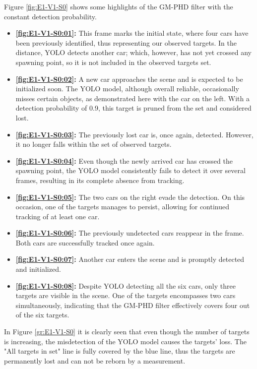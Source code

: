 Figure \ref{fig:E1-V1-S0} shows some highlights of the GM-PHD filter with the constant detection probability.
\begin{itemize}
    \item \textbf{\ref{fig:E1-V1-S0:01}:} This frame marks the initial state, where four cars have been previously
    identified, thus representing our observed targets. In the distance, YOLO detects another car; which, however,
    has not yet crossed any spawning point, so it is not included in the observed targets set.
    \item \textbf{\ref{fig:E1-V1-S0:02}:} A new car approaches the scene and is expected to be initialized soon. The
    YOLO model, although overall reliable, occasionally misses certain objects, as demonstrated here with the
    car on the left. With a detection probability of 0.9, this target is pruned from the set and considered lost.
    \item \textbf{\ref{fig:E1-V1-S0:03}:} The previously lost car is, once again, detected. However, it no longer
    falls within the set of observed targets.
    \item \textbf{\ref{fig:E1-V1-S0:04}:} Even though the newly arrived car has crossed the spawning point, the YOLO model
    consistently
    fails to detect it over several frames, resulting in its complete absence from tracking.
    \item \textbf{\ref{fig:E1-V1-S0:05}:} The two cars on the right evade the detection. On this occasion, one
    of the targets manages to persist, allowing for continued tracking of at least one car.
    \item \textbf{\ref{fig:E1-V1-S0:06}:} The previously undetected cars reappear in the frame. Both cars are
    successfully tracked once again.
    \item \textbf{\ref{fig:E1-V1-S0:07}:} Another car enters the scene and is promptly detected and initialized.
    \item \textbf{\ref{fig:E1-V1-S0:08}:} Despite YOLO detecting all the six cars, only three targets are visible in the
    scene. One of the targets encompasses two cars simultaneously, indicating that the GM-PHD filter effectively covers four out of the six targets.
\end{itemize}

In Figure \ref{gr:E1-V1-S0} it is clearly seen that even though the number of targets is increasing, the misdetection
of the YOLO model causes the targets' loss. The "All targets in set" line is fully covered by the blue line, thus the
targets are permanently lost and can not be reborn by a measurement.

